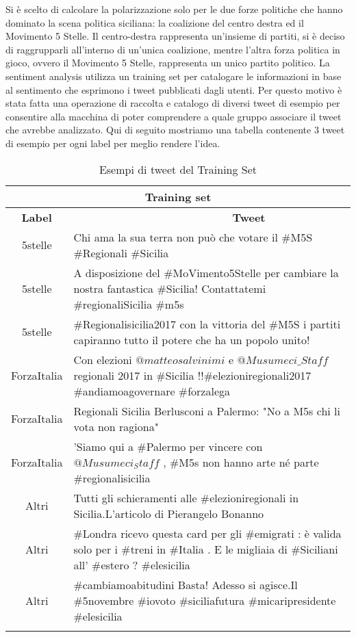 Si è scelto di calcolare la polarizzazione solo per le due forze politiche che hanno dominato la scena politica siciliana: la coalizione del centro destra  ed il Movimento 5 Stelle. Il centro-destra rappresenta un'insieme di partiti, si è deciso di raggrupparli all'interno di un'unica coalizione, mentre l'altra forza politica in gioco, ovvero il Movimento 5 Stelle, rappresenta un unico partito politico.
La sentiment analysis utilizza un training set per catalogare le informazioni in base al sentimento che esprimono i tweet pubblicati dagli utenti. Per questo motivo è stata fatta una operazione di raccolta e catalogo di diversi tweet di esempio per consentire alla macchina di poter comprendere a quale gruppo associare il tweet che avrebbe analizzato.
Qui di seguito mostriamo una tabella contenente 3 tweet di esempio per ogni label per meglio rendere l'idea.
\newpage
\begin{longtable}[c]{ |c|p{10cm}| }

 \hline
 \multicolumn{2}{|c|}{\textbf{Training set}} \\
 \hline 
 
 \textbf{Label} & \ \ \ \ \ \ \ \ \ \ \ \ \ \ \ \ \ \ \ \ \ \ \ \ \ \ \ \ \   \textbf{Tweet}\\
 \hline
 5stelle   & Chi ama la sua terra non può che votare il \#M5S \#Regionali \#Sicilia  \\ \hline
 5stelle & A disposizione del \#MoVimento5Stelle per cambiare la nostra fantastica \#Sicilia! Contattatemi \#regionaliSicilia \#m5s\\ \hline
 5stelle & \#Regionalisicilia2017 con la vittoria del \#M5S i partiti capiranno tutto il potere che ha un popolo unito! \\ \hline
 ForzaItalia &   Con elezioni $ @matteosalvinimi$ e $@Musumeci\_Staff$ regionali 2017 in \#Sicilia !!\#elezioniregionali2017 \#andiamoagovernare \#forzalega  \\ \hline
 ForzaItalia & Regionali Sicilia  Berlusconi a Palermo: "No a M5s chi li vota non ragiona" \\ \hline
 ForzaItalia & 'Siamo qui a \#Palermo per vincere con $@Musumeci_Staff$ , \#M5s non hanno arte né parte \#regionalisicilia \\ \hline
Altri & Tutti gli schieramenti alle \#elezioniregionali in Sicilia.L'articolo di Pierangelo Bonanno \\ \hline
Altri & \#Londra ricevo questa card per gli \#emigrati : è valida solo per i \#treni in \#Italia . E le migliaia di \#Siciliani all' \#estero ? \#elesicilia \\ \hline
Altri & \#cambiamoabitudini Basta! Adesso si agisce.Il \#5novembre \#iovoto \#siciliafutura \#micaripresidente \#elesicilia\\
 \hline
\caption{Esempi di tweet del Training Set}
 \label{trainingSetExample}
\end{longtable}

